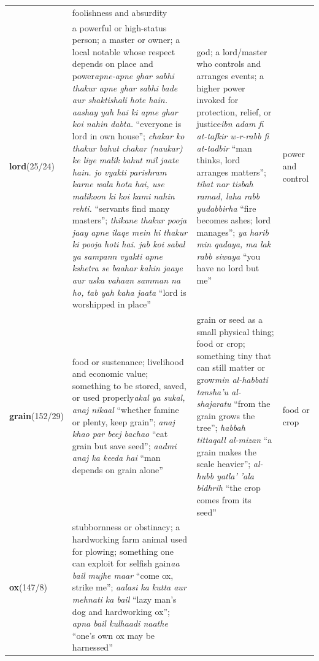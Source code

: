 \begin{table}[t]
\begin{tabular}{@{}p{}p{}p{}p{}@{}}
& foolishness and absurdity \\
\textbf{lord}\newline (25/24)
& \textcolor{encolor}{a powerful or high-status person; a master or owner; a local notable whose respect depends on place and power}\newline \textit{apne-apne ghar sabhi thakur  apne ghar sabhi bade aur shaktishali hote hain. aashay yah hai ki apne ghar koi nahin dabta.} ``everyone is lord in own house''; \textit{chakar ko thakur bahut  chakar (naukar) ke liye malik bahut mil jaate hain. jo vyakti parishram karne wala hota hai, use malikoon ki koi kami nahin rehti.} ``servants find many masters''; \textit{thikane thakur pooja jaay  apne ilaqe mein hi thakur ki pooja hoti hai. jab koi sabal ya sampann vyakti apne kshetra se baahar kahin jaaye aur uska vahaan samman na ho, tab yah kaha jaata} ``lord is worshipped in place''
& \textcolor{zhcolor}{god; a lord/master who controls and arranges events; a higher power invoked for protection, relief, or justice}\newline \textit{ibn adam fi at-tafkir w-r-rabb fi at-tadbir} ``man thinks, lord arranges matters''; \textit{tibat nar tisbah ramad, laha rabb yudabbirha} ``fire becomes ashes; lord manages''; \textit{ya harib min qadaya, ma lak rabb siwaya} ``you have no lord but me''
& power and control \\
\textbf{grain}\newline (152/29)
& \textcolor{encolor}{food or sustenance; livelihood and economic value; something to be stored, saved, or used properly}\newline \textit{akal ya sukal, anaj nikaal} ``whether famine or plenty, keep grain''; \textit{anaj khao par beej bachao} ``eat grain but save seed''; \textit{aadmi anaj ka keeda hai} ``man depends on grain alone''
& \textcolor{zhcolor}{grain or seed as a small physical thing; food or crop; something tiny that can still matter or grow}\newline \textit{min al-habbati tansha'u al-shajaratu} ``from the grain grows the tree''; \textit{habbah tittaqall al-mizan} ``a grain makes the scale heavier''; \textit{al-hubb yatla' 'ala bidhrih} ``the crop comes from its seed''
& food or crop \\
\textbf{ox}\newline (147/8)
& \textcolor{encolor}{stubbornness or obstinacy; a hardworking farm animal used for plowing; something one can exploit for selfish gain}\newline \textit{aa bail mujhe maar} ``come ox, strike me''; \textit{aalasi ka kutta aur mehnati ka bail} ``lazy man's dog and hardworking ox''; \textit{apna bail kulhaadi naathe} ``one's own ox may be harnessed''

\end{tabular}
\end{table}
